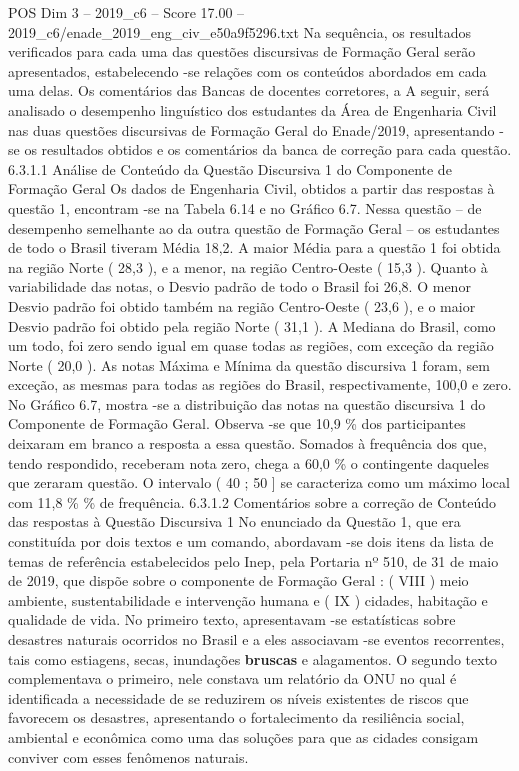 \begin{textsample}{POS Dim 3 – 2019\_c6 – Score 17.00 – 2019\_c6/enade\_2019\_eng\_civ\_e50a9f5296.txt}
Na sequência, os resultados verificados para cada uma das questões discursivas de Formação Geral serão apresentados, estabelecendo -se relações com os conteúdos abordados em cada uma delas.
Os comentários das Bancas de docentes corretores, a A seguir, será analisado o desempenho linguístico dos estudantes da Área de Engenharia Civil nas duas questões discursivas de Formação Geral do Enade/2019, apresentando -se os resultados obtidos e os comentários da banca de correção para cada questão. 6.3.1.1 Análise de Conteúdo da Questão Discursiva 1 do Componente de Formação Geral Os dados de Engenharia Civil, obtidos a partir das respostas à questão 1, encontram -se na Tabela 6.14 e no Gráfico 6.7.
Nessa questão – de desempenho semelhante ao da outra questão de Formação Geral – os estudantes de todo o Brasil tiveram Média 18,2.
A maior Média para a questão 1 foi obtida na região Norte ( 28,3 ), e a menor, na região Centro-Oeste ( 15,3 ).
Quanto à variabilidade das notas, o Desvio padrão de todo o Brasil foi 26,8.
O menor Desvio padrão foi obtido também na região Centro-Oeste ( 23,6 ), e o maior Desvio padrão foi obtido pela região Norte ( 31,1 ).
A Mediana do Brasil, como um todo, foi zero sendo igual em quase todas as regiões, com exceção da região Norte ( 20,0 ).
As notas Máxima e Mínima da questão discursiva 1 foram, sem exceção, as mesmas para todas as regiões do Brasil, respectivamente, 100,0 e zero.
No Gráfico 6.7, mostra -se a distribuição das notas na questão discursiva 1 do Componente de Formação Geral.
Observa -se que 10,9 \% dos participantes deixaram em branco a resposta a essa questão.
Somados à frequência dos que, tendo respondido, receberam nota zero, chega a 60,0 \% o contingente daqueles que zeraram questão.
O intervalo ( 40 ; 50 ] se caracteriza como um máximo local com 11,8 \% \% de frequência. 6.3.1.2 Comentários sobre a correção de Conteúdo das respostas à Questão Discursiva 1 No enunciado da Questão 1, que era constituída por dois textos e um comando, abordavam -se dois itens da lista de temas de referência estabelecidos pelo Inep, pela Portaria nº 510, de 31 de maio de 2019, que dispõe sobre o componente de Formação Geral : ( VIII ) meio ambiente, sustentabilidade e intervenção humana e ( IX ) cidades, habitação e qualidade de vida.
No primeiro texto, apresentavam -se estatísticas sobre desastres naturais ocorridos no Brasil e a eles associavam -se eventos recorrentes, tais como estiagens, secas, inundações \textbf{bruscas} e alagamentos.
O segundo texto complementava o primeiro, nele constava um relatório da ONU no qual é identificada a necessidade de se reduzirem os níveis existentes de riscos que favorecem os desastres, apresentando o fortalecimento da resiliência social, ambiental e econômica como uma das soluções para que as cidades consigam conviver com esses fenômenos naturais.

\end{textsample}
